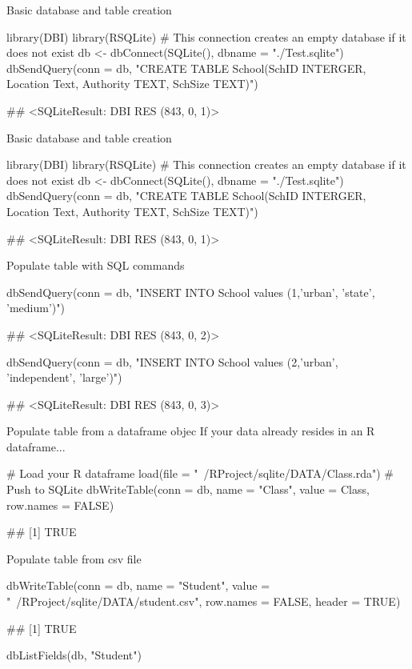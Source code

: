 \begin{frame}{Basic database and table creation}

library(DBI)
library(RSQLite)
# This connection creates an empty database if it does not exist
db <- dbConnect(SQLite(), dbname = "./Test.sqlite")
dbSendQuery(conn = db, "CREATE TABLE School(SchID INTERGER, Location Text,
Authority TEXT, SchSize TEXT)")

## <SQLiteResult: DBI RES (843, 0, 1)>

\end{frame}


Basic database and table creation

library(DBI)
library(RSQLite)
# This connection creates an empty database if it does not exist
db <- dbConnect(SQLite(), dbname = "./Test.sqlite")
dbSendQuery(conn = db, "CREATE TABLE School(SchID INTERGER, Location Text,
Authority TEXT, SchSize TEXT)")

## <SQLiteResult: DBI RES (843, 0, 1)>

\begin{frame}{Populate table with SQL commands}

dbSendQuery(conn = db, "INSERT INTO School values (1,'urban', 'state', 'medium')")


## <SQLiteResult: DBI RES (843, 0, 2)>


dbSendQuery(conn = db, "INSERT INTO School values (2,'urban', 'independent', 'large')")


## <SQLiteResult: DBI RES (843, 0, 3)>
\end{frame}



\begin{frame}{Populate table from a dataframe objec}
If your data already resides in an R dataframe...


# Load your R dataframe
load(file = "~/RProject/sqlite/DATA/Class.rda")
# Push to SQLite
dbWriteTable(conn = db, name = "Class", value = Class, row.names = FALSE)

## [1] TRUE


\end{frame}



Populate table from csv file

dbWriteTable(conn = db, name = "Student", value = "~/RProject/sqlite/DATA/student.csv",
    row.names = FALSE, header = TRUE)

## [1] TRUE


dbListFields(db, "Student")

